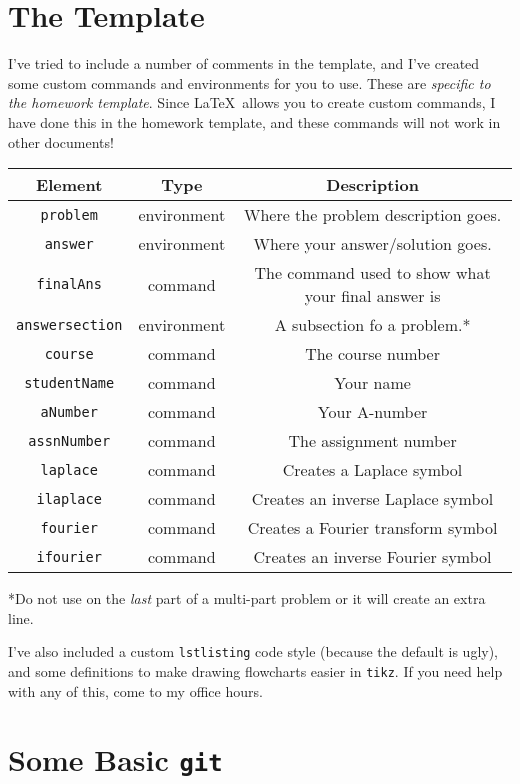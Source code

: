 \documentclass[a4paper,10pt]{article}
\begin{document}
\section{The Template}
I've tried to include a number of comments in the template, and I've created some custom commands and environments for you to use. These are \emph{specific to the homework template}. Since \LaTeX\ allows you to create custom commands, I have done this in the homework template, and these commands will not work in other documents!
\begin{center}
	\begin{tabular}{|c|c|c|} \hline
		\textbf{Element} & \textbf{Type} & \textbf{Description} \\ \hline
		\texttt{problem} & environment & Where the problem description goes. \\
		\texttt{answer} & environment & Where your answer/solution goes. \\
		\texttt{finalAns} & command & The command used to show what your final answer is \\
		\texttt{answersection} & environment & A subsection fo a problem.* \\
		\texttt{course} & command & The course number \\
		\texttt{studentName} & command & Your name \\
		\texttt{aNumber} & command & Your A-number \\
		\texttt{assnNumber} & command & The assignment number \\
		\texttt{laplace} & command & Creates a Laplace symbol \\
		\texttt{ilaplace} & command & Creates an inverse Laplace symbol \\
		\texttt{fourier} & command & Creates a Fourier transform symbol \\
		\texttt{ifourier} & command & Creates an inverse Fourier symbol \\ \hline
	\end{tabular}
	*Do not use on the \emph{last} part of a multi-part problem or it will create an extra line.
\end{center}

I've also included a custom \texttt{lstlisting} code style (because the default is ugly), and some definitions to make drawing flowcharts easier in \texttt{tikz}. If you need help with any of this, come to my office hours.

\section{Some Basic \texttt{git}}
\end{document}
